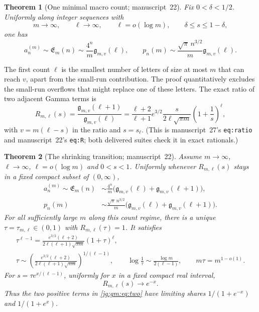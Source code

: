 \documentclass[11pt,a4paper]{article}
\newtheorem{theorem}{Theorem}[section]
\theoremstyle{definition}\newaliascnt{definition}{theorem}
\theoremstyle{remark}\newaliascnt{remark}{theorem}
\begin{document}
\begin{theorem}[One minimal macro count; manuscript~22]\label{jg:gm:thm:ordinary}
Fix $0<\delta<1/2$. Uniformly along integer sequences with
\[
 m\to\infty,\qquad \ell\to\infty,\qquad
 \ell=o(\log m),\qquad \delta\le s\le1-\delta,
\]
one has
\begin{equation}\label{jg:gm:eq:ordinary}
 a_n^{(m)}\sim\mathfrak E_m(n)\sim\frac{4^n}{m}\mathfrak g_{m,v}(\ell),
 \qquad
 p_n(m)\sim\frac{\sqrt\pi\,n^{3/2}}m\mathfrak g_{m,v}(\ell).
\end{equation}
\end{theorem}

The first count $\ell$ is the smallest number of letters of size at most $m$
that can reach $v$, apart from the small-run contribution. The proof
quantitatively excludes the small-run overflows that might replace one of these
letters. The exact ratio of two adjacent Gamma terms is
\begin{equation}\label{jg:gm:eq:R}
 R_{m,\ell}(s)=\frac{\mathfrak g_{m,v}(\ell+1)}{\mathfrak g_{m,v}(\ell)}
 =\frac{\ell+2}{\ell+1}e^{3/2}
       \frac{s}{2\ell\sqrt{\pi m}}\left(1+\frac1s\right)^\ell,
\end{equation}
with $v=m(\ell-s)$ in the ratio and $s=s_\ell$. (This is manuscript~27's
\texttt{eq:ratio} and manuscript~22's \texttt{eq:R}; both delivered suites check
it in exact rationals.)

\begin{theorem}[The shrinking transition; manuscript~22]
\label{jg:gm:thm:transition}
Assume $m\to\infty$, $\ell\to\infty$, $\ell=o(\log m)$ and $0<s<1$. Uniformly
whenever $R_{m,\ell}(s)$ stays in a fixed compact subset of $(0,\infty)$,
\begin{equation}\label{jg:gm:eq:two}
 \begin{split}
 a_n^{(m)}\sim\mathfrak E_m(n)
   &\sim\frac{4^n}{m}\bigl(\mathfrak g_{m,v}(\ell)+\mathfrak g_{m,v}(\ell+1)\bigr),\\
 p_n(m)&\sim\frac{\sqrt\pi\,n^{3/2}}m
                   \bigl(\mathfrak g_{m,v}(\ell)+\mathfrak g_{m,v}(\ell+1)\bigr).
 \end{split}
\end{equation}
For all sufficiently large $m$ along this count regime, there is a unique
$\tau=\tau_{m,\ell}\in(0,1)$ with $R_{m,\ell}(\tau)=1$. It satisfies
\begin{equation}\label{jg:gm:eq:tau}
 \begin{gathered}
 \tau^{\ell-1}
  =\frac{e^{3/2}(\ell+2)}{2\ell(\ell+1)\sqrt{\pi m}}(1+\tau)^\ell,\\
 \tau\sim
 \left(\frac{e^{3/2}(\ell+2)}{2\ell(\ell+1)\sqrt{\pi m}}\right)^{1/(\ell-1)},
 \qquad
 \log\frac1\tau\sim\frac{\log m}{2(\ell-1)},\qquad
 m\tau=m^{1-o(1)}.
 \end{gathered}
\end{equation}
For $s=\tau e^{x/(\ell-1)}$, uniformly for $x$ in a fixed compact real interval,
\begin{equation}\label{jg:gm:eq:logistic}
 R_{m,\ell}(s)\to e^{-x}.
\end{equation}
Thus the two positive terms in \eqref{jg:gm:eq:two} have limiting shares
$1/(1+e^{-x})$ and $1/(1+e^x)$.
\end{theorem}
\end{document}
